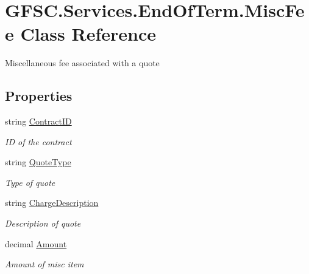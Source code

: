 \hypertarget{class_g_f_s_c_1_1_services_1_1_end_of_term_1_1_misc_fee}{}\section{G\+F\+S\+C.\+Services.\+End\+Of\+Term.\+Misc\+Fee Class Reference}
\label{class_g_f_s_c_1_1_services_1_1_end_of_term_1_1_misc_fee}


Miscellaneous fee associated with a quote  


\subsection*{Properties}
\begin{DoxyCompactItemize}
\item 
string \mbox{\hyperlink{class_g_f_s_c_1_1_services_1_1_end_of_term_1_1_misc_fee_a6cd4f96dd03589c67a928f42ff898d3e}{Contract\+ID}}
\begin{DoxyCompactList}\small\item\em ID of the contract \end{DoxyCompactList}\item 
string \mbox{\hyperlink{class_g_f_s_c_1_1_services_1_1_end_of_term_1_1_misc_fee_ab5b2e45c78869e3ad469fc850c716b36}{Quote\+Type}}
\begin{DoxyCompactList}\small\item\em Type of quote \end{DoxyCompactList}\item 
string \mbox{\hyperlink{class_g_f_s_c_1_1_services_1_1_end_of_term_1_1_misc_fee_a2ce815aab6e7c5a8fd1b9742770befb3}{Charge\+Description}}
\begin{DoxyCompactList}\small\item\em Description of quote \end{DoxyCompactList}\item 
decimal \mbox{\hyperlink{class_g_f_s_c_1_1_services_1_1_end_of_term_1_1_misc_fee_af872fbc6877b7626f7114d32de62122a}{Amount}}
\begin{DoxyCompactList}\small\item\em Amount of misc item \end{DoxyCompactList}\item 

\end{DoxyCompactItemize}
